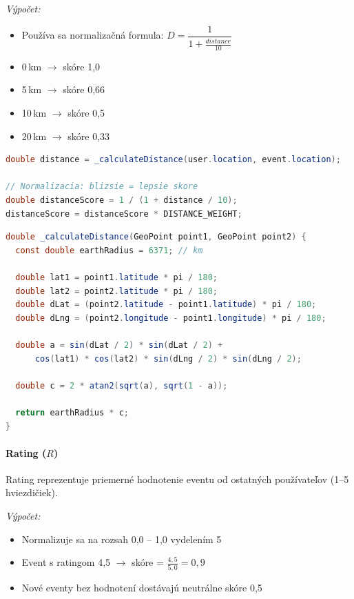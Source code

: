 \textit{Výpočet:}
\begin{itemize}
    \item Používa sa normalizačná formula: $D = \dfrac{1}{1 + \frac{distance}{10}}$
    \item 0\,km $\rightarrow$ skóre 1,0
    \item 5\,km $\rightarrow$ skóre 0,66
    \item 10\,km $\rightarrow$ skóre 0,5
    \item 20\,km $\rightarrow$ skóre 0,33
\end{itemize}

\begin{lstlisting}[language=Java, caption=Výpočet skóre vzdialenosti]
double distance = _calculateDistance(user.location, event.location);

// Normalizacia: blizsie = lepsie skore
double distanceScore = 1 / (1 + distance / 10);
distanceScore = distanceScore * DISTANCE_WEIGHT;
\end{lstlisting}

\begin{lstlisting}[language=Java, caption=Haversinov vzorec pre výpočet vzdialenosti]
double _calculateDistance(GeoPoint point1, GeoPoint point2) {
  const double earthRadius = 6371; // km

  double lat1 = point1.latitude * pi / 180;
  double lat2 = point2.latitude * pi / 180;
  double dLat = (point2.latitude - point1.latitude) * pi / 180;
  double dLng = (point2.longitude - point1.longitude) * pi / 180;

  double a = sin(dLat / 2) * sin(dLat / 2) +
      cos(lat1) * cos(lat2) * sin(dLng / 2) * sin(dLng / 2);

  double c = 2 * atan2(sqrt(a), sqrt(1 - a));

  return earthRadius * c;
}
\end{lstlisting}

\paragraph{Rating ($R$)}

Rating reprezentuje priemerné hodnotenie eventu od ostatných používateľov (1--5 hviezdičiek).

\textit{Výpočet:}
\begin{itemize}
    \item Normalizuje sa na rozsah 0,0 -- 1,0 vydelením 5
    \item Event s ratingom 4,5 $\rightarrow$ skóre = $\frac{4{,}5}{5{,}0} = 0{,}9$
    \item Nové eventy bez hodnotení dostávajú neutrálne skóre 0,5
\end{itemize}

